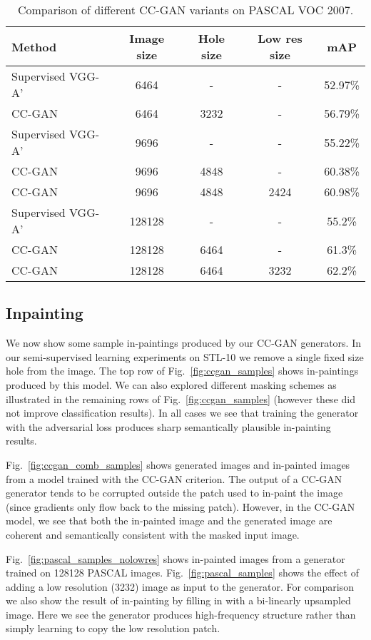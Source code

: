 \documentclass{article} \usepackage{iclr2017_conference,times}
\newcommand{\fig}[1]{Fig.~\ref{fig:#1}}
\begin{document}
\begin{table}[!t]
\centering
\small
\begin{tabularx}{0.8\textwidth}{l|c|c|c|c}
\bf{Method} & {\bf Image size} & {\bf Hole size} & {\bf Low res size} & \bf{mAP}\\
\hline
\hline
Supervised VGG-A' & 6464 & - & - & 52.97\%\\
CC-GAN & 6464 & 3232 & - & 56.79\%\\
\hline
Supervised VGG-A' & 9696 & - & - & 55.22\%\\
CC-GAN & 9696 & 4848 & - & 60.38\%\\
CC-GAN & 9696 & 4848 & 2424 & 60.98\%\\
\hline
Supervised VGG-A' & 128128 & - & - & 55.2\%\\
CC-GAN & 128128 & 6464 & - & 61.3\%\\
CC-GAN & 128128 & 6464 & 3232  & 62.2\%\\
\end{tabularx}
\vspace{2mm}
\caption{Comparison of different CC-GAN variants on PASCAL VOC 2007.}
\label{tab:pascal_detail}
\end{table}




\subsection{Inpainting}
We now show some sample in-paintings produced by our CC-GAN
generators.  In our semi-supervised learning experiments on STL-10 we
remove a single fixed size hole from the image.  The top row of
\fig{ccgan_samples} shows in-paintings produced by this model.  We can
also explored different masking schemes as illustrated in the
remaining rows of \fig{ccgan_samples} (however these did not improve
classification results).  In all cases we see that
training the generator with the adversarial loss produces sharp
semantically plausible in-painting results.

\fig{ccgan_comb_samples} shows generated images and in-painted images
from a model trained with the CC-GAN criterion.  The output of a
CC-GAN generator tends to be corrupted outside the patch used to
in-paint the image (since gradients only flow back to the missing patch). However, in the CC-GAN model, we see that both the
in-painted image and the generated image are coherent and semantically
consistent with the masked input image.

\fig{pascal_samples_nolowres} shows in-painted images from a generator
trained on 128128 PASCAL images.  \fig{pascal_samples} shows
the effect of adding a low resolution (3232) image as input to
the generator.  For comparison we also show the result of in-painting
by filling in with a bi-linearly upsampled image.  Here we see the
generator produces high-frequency structure rather than simply learning to copy the low resolution patch.
\end{document}
